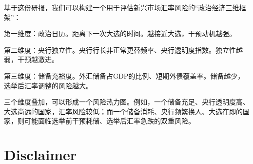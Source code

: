 \documentclass[11pt]{ctexart}
\begin{document}
基于这份研报，我们可以构建一个用于评估新兴市场汇率风险的“政治经济三维框架”：

第一维度：政治日历。距离下一次大选的时间。越接近大选，干预动机越强。

第二维度：央行独立性。央行行长非正常更替频率、央行透明度指数。独立性越弱，干预越激进。

第三维度：储备充裕度。外汇储备占GDP的比例、短期外债覆盖率。储备越少，选举后汇率调整的风险越大。

三个维度叠加，可以形成一个风险热力图。例如，一个储备充足、央行透明度高、大选尚远的国家，汇率风险较低；而一个储备消耗、央行频繁换人、大选在即的国家，则可能面临选举前干预耗储、选举后汇率急跌的双重风险。

\section{Disclaimer}
\end{document}
